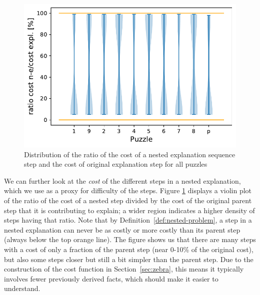 
\begin{figure}[h]
	\centering
	\includegraphics[width=.6\textwidth]{figures/violin_plot.pdf}
	\caption{Distribution of the ratio of the cost of a nested explanation sequence step and the cost of original explanation step for all puzzles}
	\label{fig:experiments:violin}
\end{figure}


We can further look at the \textit{cost} of the different steps in a nested explanation, which we use as a proxy for difficulty of the steps. 
Figure \ref{fig:experiments:violin} displays a violin plot of the ratio of the cost of a nested step divided by the cost of the original parent step that it is contributing to explain; a wider region indicates a higher density of steps having that ratio. 
Note that by Definition~\ref{def:nested-problem}, a step in a nested explanation can never be as costly or more costly than its parent step (always below the top orange line).
The figure shows us that there are many steps with a cost of only a fraction of the parent step (near 0-10\% of the original cost), but also some steps closer but still a bit simpler than the parent step. 
Due to the construction of the cost function in Section~\ref{sec:zebra}, this means it typically involves fewer previously derived facts, which should make it easier to understand. 



